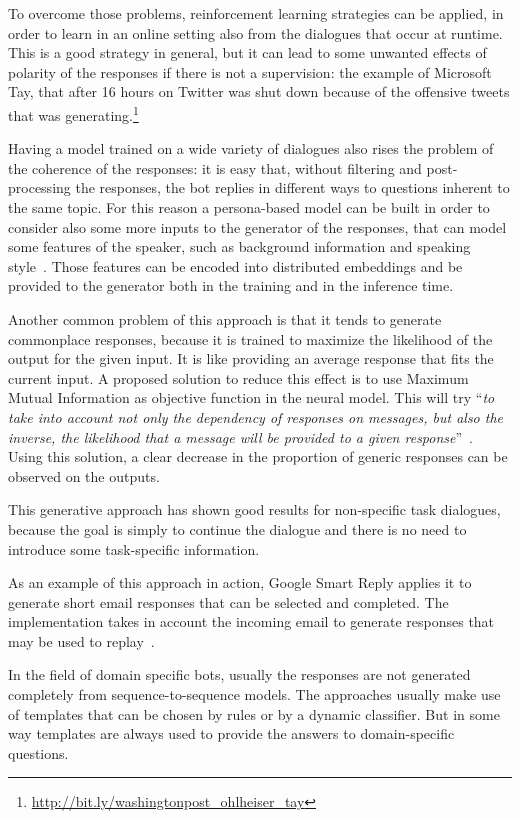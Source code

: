 To overcome those problems, reinforcement learning strategies can be applied, in order to learn in an online setting also from the dialogues that occur at runtime. This is a good strategy in general, but it can lead to some unwanted effects of polarity of the responses if there is not a supervision: the example of Microsoft Tay, that after 16 hours on Twitter was shut down because of the offensive tweets that was generating.\footnote{\url{http://bit.ly/washingtonpost_ohlheiser_tay}}

Having a model trained on a wide variety of dialogues also rises the problem of the coherence of the responses: it is easy that, without filtering and post-processing the responses, the bot replies in different ways to questions inherent to the same topic. For this reason a persona-based model can be built in order to consider also some more inputs to the generator of the responses, that can model some features of the speaker, such as background information and speaking style~\cite{li2016persona}. Those features can be encoded into distributed embeddings and be provided to the generator both in the training and in the inference time.

Another common problem of this approach is that it tends to generate commonplace responses, because it is trained to maximize the likelihood of the output for the given input. It is like providing an average response that fits the current input. A proposed solution to reduce this effect is to use Maximum Mutual Information as objective function in the neural model. This will try ``\textit{to take into account not only the dependency of responses on messages, but also the inverse, the likelihood that a message will be provided to a given response}''~\cite{li2015diversity}. Using this solution, a clear decrease in the proportion of generic responses can be observed on the outputs.

This generative approach has shown good results for non-specific task dialogues, because the goal is simply to continue the dialogue and there is no need to introduce some task-specific information.

As an example of this approach in action, Google Smart Reply applies it to generate short email responses that can be selected and completed. The implementation takes in account the incoming email to generate responses that may be used to replay~\cite{kannan2016smart}.

In the field of domain specific bots, usually the responses are not generated completely from sequence-to-sequence models. The approaches usually make use of templates that can be chosen by rules or by a dynamic classifier. But in some way templates are always used to provide the answers to domain-specific questions.

